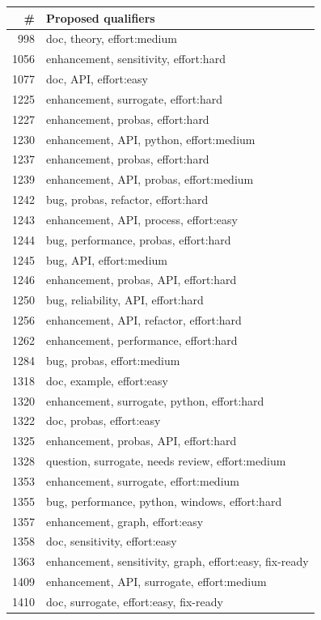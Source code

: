 \documentclass[a4paper,11pt]{article}
\begin{document}
\footnotesize
\begin{longtable}{rp{10.8cm}}
\toprule
\# & Proposed qualifiers \\
\midrule
\endhead
998 & doc, theory, effort:medium \\
1056 & enhancement, sensitivity, effort:hard \\
1077 & doc, API, effort:easy \\
1225 & enhancement, surrogate, effort:hard \\
1227 & enhancement, probas, effort:hard \\
1230 & enhancement, API, python, effort:medium \\
1237 & enhancement, probas, effort:hard \\
1239 & enhancement, API, probas, effort:medium \\
1242 & bug, probas, refactor, effort:hard \\
1243 & enhancement, API, process, effort:easy \\
1244 & bug, performance, probas, effort:hard \\
1245 & bug, API, effort:medium \\
1246 & enhancement, probas, API, effort:hard \\
1250 & bug, reliability, API, effort:hard \\
1256 & enhancement, API, refactor, effort:hard \\
1262 & enhancement, performance, effort:hard \\
1284 & bug, probas, effort:medium \\
1318 & doc, example, effort:easy \\
1320 & enhancement, surrogate, python, effort:hard \\
1322 & doc, probas, effort:easy \\
1325 & enhancement, probas, API, effort:hard \\
1328 & question, surrogate, needs review, effort:medium \\
1353 & enhancement, surrogate, effort:medium \\
1355 & bug, performance, python, windows, effort:hard \\
1357 & enhancement, graph, effort:easy \\
1358 & doc, sensitivity, effort:easy \\
1363 & enhancement, sensitivity, graph, effort:easy, fix-ready \\
1409 & enhancement, API, surrogate, effort:medium \\
1410 & doc, surrogate, effort:easy, fix-ready \\

\end{longtable}
\end{document}
